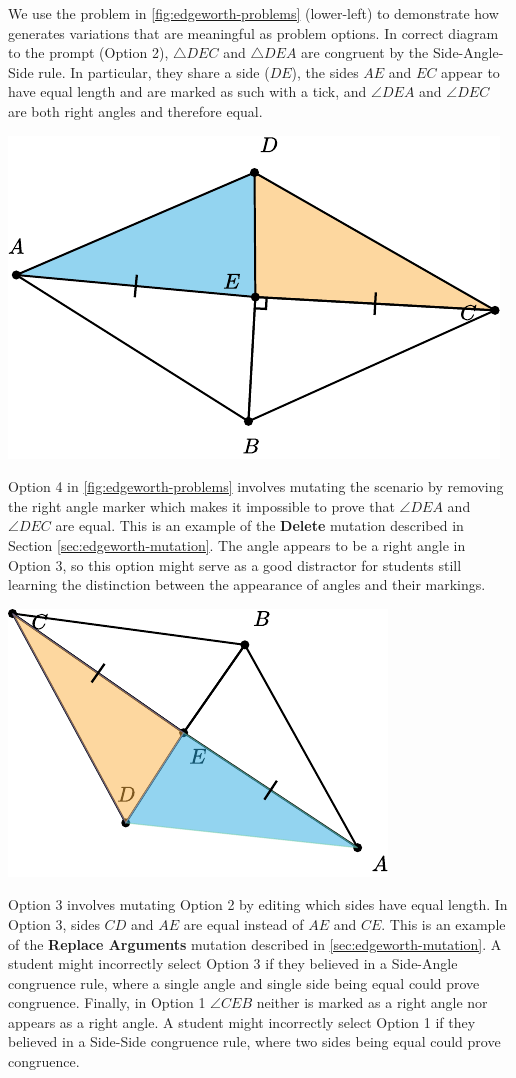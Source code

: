We use the problem in \cref{fig:edgeworth-problems} (lower-left) to demonstrate how \Edgeworth generates variations that are meaningful as problem options. In correct diagram to the prompt (Option 2), $\triangle DEC$ and $\triangle DEA$ are congruent by the Side-Angle-Side rule. In particular, they share a side ($DE$), the sides $AE$ and $EC$ appear to have equal length and are marked as such with a tick, and $\angle DEA$ and $\angle DEC$ are both right angles and therefore equal. 

\begin{center}
   \includegraphics[width=.3\linewidth]{assets/edgeworth/congruent-triangles-opt-2.pdf}
\end{center}


Option 4 in \cref{fig:edgeworth-problems} involves mutating the scenario by removing the right angle marker which makes it impossible to prove that $\angle DEA$ and $\angle DEC$ are equal. This is an example of the \textbf{Delete} mutation described in Section \ref{sec:edgeworth-mutation}. The angle appears to be a right angle in Option 3, so this option might serve as a good distractor for students still learning the distinction between the appearance of angles and their markings.

\begin{center}
   \includegraphics[width=.3\linewidth]{assets/edgeworth/congruent-triangles-opt-4.pdf}
\end{center}


Option 3 involves mutating Option 2 by editing which sides have equal length. In Option 3, sides $CD$ and $AE$ are equal instead of $AE$ and $CE$. This is an example of the \textbf{Replace Arguments} mutation described in \cref{sec:edgeworth-mutation}. A student might incorrectly select Option 3 if they believed in a Side-Angle congruence rule, where a single angle and single side being equal could prove congruence. Finally, in Option 1 $\angle CEB$ neither is marked as a right angle nor appears as a right angle. A student might incorrectly select Option 1 if they believed in a Side-Side congruence rule, where two sides being equal could prove congruence.

